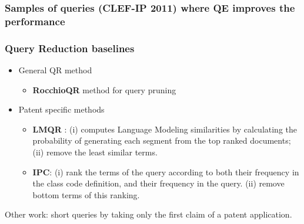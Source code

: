 \documentclass[xcolor=x11names,compress]{beamer}
\renewcommand{\(}{\begin{columns}}
\renewcommand{\)}{\end{columns}}
\newcommand{\<}[1]{\begin{column}{#1}}
\renewcommand{\>}{\end{column}}
\begin{document}
\begin{frame}
\frametitle{Samples of queries (CLEF-IP 2011) where QE improves
the performance}


\end{frame}



\begin{frame}
\frametitle{Query Reduction baselines}

\begin{itemize}
\item {\color{DeepSkyBlue4}General QR method}
	\begin{itemize}
	\item \textbf{RocchioQR} method for query pruning
	\end{itemize}	
\item {\color{DeepSkyBlue4}Patent specific methods}	
	\begin{itemize}
	\item \textbf{LMQR} \cite{Ganguly2011}: (i) computes Language Modeling similarities by calculating the probability of generating each segment from the top ranked documents; (ii) remove the least similar terms.
	\item \textbf{IPC}: 
(i) rank the terms of the query according to both their frequency in the class
code definition, and their frequency in the query.
(ii) remove bottom terms of this ranking.
\end{itemize}
\end{itemize}

\vspace{0.5cm}
\begin{small}
{\color{DeepSkyBlue4}Other work}: \cite{Mahdabi2013} short queries by taking only the first claim of a patent application.
\end{small}
\end{frame}
\end{document}
